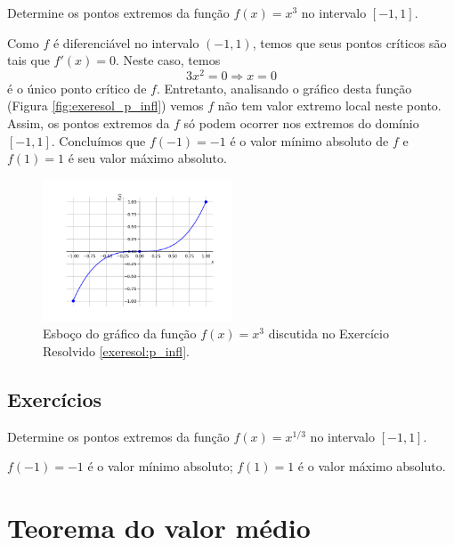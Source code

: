 \begin{exeresol}\label{exeresol:p_infl}
  Determine os pontos extremos da função $f(x)=x^3$ no intervalo $[-1,1]$.
\end{exeresol}
\begin{resol}
  Como $f$ é diferenciável no intervalo $(-1,1)$, temos que seus pontos críticos são tais que $f'(x)=0$. Neste caso, temos
  \begin{equation}
    3x^2=0\Rightarrow x=0
  \end{equation}
  é o único ponto crítico de $f$. Entretanto, analisando o gráfico desta função (Figura \ref{fig:exeresol_p_infl}) vemos $f$ não tem valor extremo local neste ponto. Assim, os pontos extremos da $f$ só podem ocorrer nos extremos do domínio $[-1,1]$. Concluímos que $f(-1)=-1$ é o valor mínimo absoluto de $f$ e $f(1)=1$ é seu valor máximo absoluto.

  \begin{figure}[H]
    \centering
    \includegraphics[width=0.5\textwidth]{./cap_apderiv/dados/fig_exeresol_p_infl/fig_exeresol_p_infl}
    \caption{Esboço do gráfico da função $f(x) = x^3$ discutida no Exercício Resolvido \ref{exeresol:p_infl}.}
    \label{fig:exeresol_f_diff}
  \end{figure}
\end{resol}

\subsection{Exercícios}

\begin{ex}
  Determine os pontos extremos da função $f(x)=x^{1/3}$ no intervalo $[-1,1]$.
\end{ex}
\begin{resp}
  $f(-1)=-1$ é o valor mínimo absoluto; $f(1)=1$ é o valor máximo absoluto.
\end{resp}

\emconstrucao

\section{Teorema do valor médio}\label{cap_apderiv_sec_valormedio}

